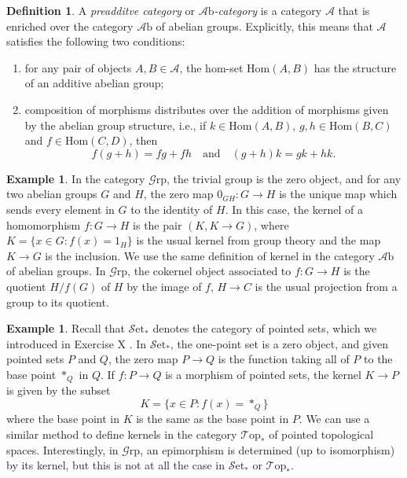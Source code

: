 \documentclass[10pt,oneside]{book}
\def\~#1{\mathscr{#1}}
\newcommand{\Hom}{\mathrm{Hom}}
\newcommand{\Set}{\~S\mathrm{et}}
\newcommand{\Grp}{\~G\mathrm{rp}}
\newcommand{\Ab}{\~A\mathrm{b}}
\newcommand{\Top}{\~T\mathrm{op}}
\theoremstyle{plain}
\theoremstyle{definition}
\newtheorem{defn}[thm]{Definition}
\newtheorem{ex}[thm]{Example}
\theoremstyle{remark}
\numberwithin{equation}{section}
\numberwithin{figure}{section}
\begin{document}
\begin{defn}
    A \emph{preadditve category} or \emph{$\Ab$-category }is a category $\~A$ that is enriched over the category $\Ab$ of abelian groups. Explicitly, this means that $\~A$ satisfies the following two conditions:
    \begin{enumerate}[label=(\roman*)]
        \item for any pair of objects $A, B \in \~A$, the hom-set $\Hom(A, B)$ has the structure of an additive abelian group;
        \item composition of morphisms distributes over the addition of morphisms given by the abelian group structure, i.e., if $k \in \Hom(A, B)$, $g, h \in \Hom(B, C)$ and $f \in \Hom(C, D)$, then
        \[f  (g + h) = f  g + f  h \quad \text{and} \quad (g + h)  k = g  k + h  k.\]
    \end{enumerate}
\end{defn}

\begin{ex}
    In the category $\Grp$, the trivial group is the zero object, and for any two abelian groups $G$ and $H$, the zero map $0_{GH}: G \to H$ is the unique map which sends every element in $G$ to the identity of $H$. In this case, the kernel of a homomorphism $f: G \to H$ is the pair $(K, K \to G)$, where $K = \{x \in G : f(x) = 1_H\}$ is the usual kernel from group theory and the map $K\to G$ is the inclusion. We use the same definition of kernel in the category $\Ab$ of abelian groups. In $\Grp$, the cokernel object associated to $f: G \to H$ is the quotient $H/f(G)$ of $H$ by the image of $f$, $H \to C$ is the usual projection from a group to its quotient.
\end{ex}

\begin{ex}
    Recall that $\Set_*$ denotes the category of pointed sets, which we introduced in Exercise X . In $\Set_*$, the one-point set is a zero object, and given pointed sets $P$ and $Q$, the zero map $P \to Q$ is the function taking all of $P$ to the base point $*_Q$ in $Q$. If $f: P \to Q$ is a morphism of pointed sets, the kernel $K \to P$ is given by the subset 
    \[K = \{x \in P : f(x) = *_Q\}\]
    where the base point in $K$ is the same as the base point in $P$. We can use a similar method to define kernels in the category $\Top_\ast$ of pointed topological spaces. Interestingly, in $\Grp$, an epimorphism is determined (up to isomorphism) by its kernel, but this is not at all the case in $\Set_*$ or $\Top_*$.
\end{ex}
\end{document}
